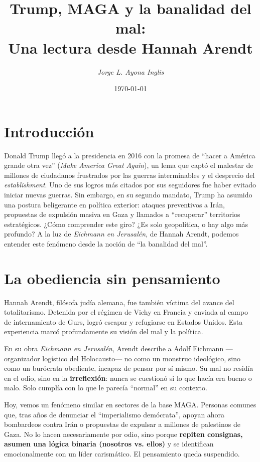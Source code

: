 \documentclass[12pt]{article}
\title{\textbf{Trump, MAGA y la banalidad del mal:\\ Una lectura desde Hannah Arendt}}
\author{\textit{Jorge L. Ayona Inglis}}
\date{\today}
\begin{document}
\maketitle

\section*{Introducción}

Donald Trump llegó a la presidencia en 2016 con la promesa de ``hacer a América grande otra vez'' (\textit{Make America Great Again}), un lema que captó el malestar de millones de ciudadanos frustrados por las guerras interminables y el desprecio del \textit{establishment}. Uno de sus logros más citados por sus seguidores fue haber evitado iniciar nuevas guerras. Sin embargo, en su segundo mandato, Trump ha asumido una postura beligerante en política exterior: ataques preventivos a Irán, propuestas de expulsión masiva en Gaza y llamados a ``recuperar'' territorios estratégicos. ¿Cómo comprender este giro? ¿Es solo geopolítica, o hay algo más profundo? A la luz de \textit{Eichmann en Jerusalén}, de Hannah Arendt, podemos entender este fenómeno desde la noción de ``la banalidad del mal''.

\section*{La obediencia sin pensamiento}

Hannah Arendt, filósofa judía alemana, fue también víctima del avance del totalitarismo. Detenida por el régimen de Vichy en Francia y enviada al campo de internamiento de Gurs, logró escapar y refugiarse en Estados Unidos. Esta experiencia marcó profundamente su visión del mal y la política. 

En su obra \textit{Eichmann en Jerusalén}, Arendt describe a Adolf Eichmann ---organizador logístico del Holocausto--- no como un monstruo ideológico, sino como un burócrata obediente, incapaz de pensar por sí mismo. Su mal no residía en el odio, sino en la \textbf{irreflexión}: nunca se cuestionó si lo que hacía era bueno o malo. Solo cumplía con lo que le parecía ``normal'' en su contexto.

Hoy, vemos un fenómeno similar en sectores de la base MAGA. Personas comunes que, tras años de denunciar el ``imperialismo demócrata'', apoyan ahora bombardeos contra Irán o propuestas de expulsar a millones de palestinos de Gaza. No lo hacen necesariamente por odio, sino porque \textbf{repiten consignas, asumen una lógica binaria (nosotros vs. ellos)} y se identifican emocionalmente con un líder carismático. El pensamiento queda suspendido.
\end{document}
